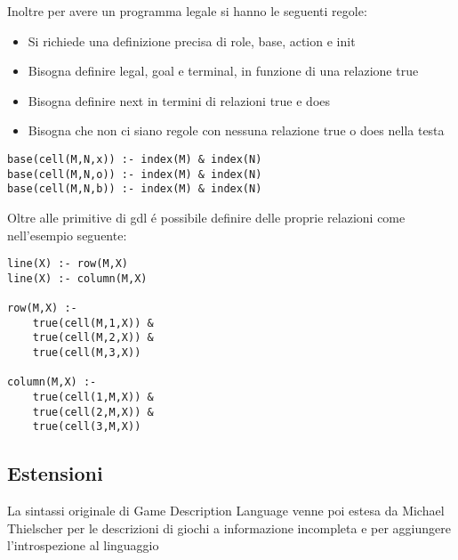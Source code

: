 Inoltre per avere un programma legale si hanno le seguenti regole:
\begin{itemize}
    \item Si richiede una definizione precisa di role, base, action e init
    \item Bisogna definire legal, goal e terminal, in funzione di una relazione true 
    \item Bisogna definire next in termini di relazioni true e does
    \item Bisogna che non ci siano regole con nessuna relazione true o does nella testa
\end{itemize} 
\begin{lstlisting}[caption=Esempio: definizione cella di tris]
base(cell(M,N,x)) :- index(M) & index(N)
base(cell(M,N,o)) :- index(M) & index(N)
base(cell(M,N,b)) :- index(M) & index(N)
\end{lstlisting}
Oltre alle primitive di gdl é possibile definire delle proprie relazioni come nell'esempio seguente:
\begin{lstlisting}[caption=colonnet e righe in tris]
line(X) :- row(M,X)
line(X) :- column(M,X)

row(M,X) :- 
    true(cell(M,1,X)) &
    true(cell(M,2,X)) &
    true(cell(M,3,X)) 

column(M,X) :- 
    true(cell(1,M,X)) &
    true(cell(2,M,X)) &
    true(cell(3,M,X)) 
\end{lstlisting} 


\subsection{Estensioni}
La sintassi originale di Game Description Language venne poi estesa da Michael Thielscher per le descrizioni di giochi 
a informazione incompleta \cite*{GDL2} e per aggiungere l'introspezione al linguaggio  \cite*{GDL3}

